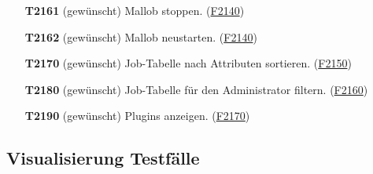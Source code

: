 \begin{itemize}
    \item[\textbf{T2161}] (gewünscht) \gls{Mallob} stoppen. (\hyperref[FA:Web-Interface:Verwalten von Malllob]{F2140})
    
    \item[\textbf{T2162}] (gewünscht) \gls{Mallob} neustarten. (\hyperref[FA:Web-Interface:Verwalten von Malllob]{F2140})
    
    \item[\textbf{T2170}] (gewünscht) Job-Tabelle nach Attributen sortieren. (\hyperref[FA:Web-Interface:Sortieren der Tabelle]{F2150})
    
    \item[\textbf{T2180}] (gewünscht) Job-Tabelle für den \gls{Administrator} filtern. (\hyperref[FA:Web-Interface:Filtern für Admins]{F2160})
    
    
    \item[\textbf{T2190}] (gewünscht) Plugins anzeigen. (\hyperref[FA:Web-Interface:Anzeigen von Plugins]{F2170})
    
\end{itemize}

\subsection{Visualisierung Testfälle}

